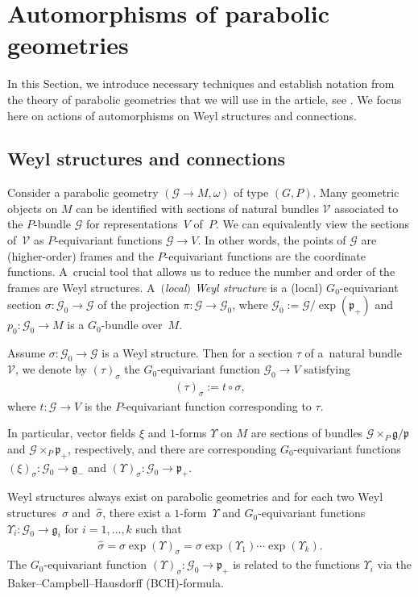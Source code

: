 \documentclass[10pt,a4paper]{amsart}
\newcommand{\om}{\omega}
\newcommand{\si}{\sigma}
\newcommand{\ba}{\mathcal{G}}
\newcommand{\fg}{\mathfrak g}
\newcommand{\fp}{\mathfrak p}
\newcommand{\U}{\Upsilon}
\numberwithin{equation}{section}
\begin{document}
\section{Automorphisms of parabolic geometries} \label{sec2}
In this Section, we introduce necessary techniques and establish notation from the theory of parabolic geometries that we will use in the article, see \cite[Section 5.1]{parabook}. We focus here on actions of automorphisms on Weyl structures and connections.

\subsection{Weyl structures and connections}\label{sec2.1}

Consider a parabolic geometry $(\ba \to M, \om)$ of type $(G,P)$. Many geometric objects on $M$ can be identif\/ied with sections of natural bundles $\mathcal{V}$ associated to the $P$-bundle $\ba$ for representa\-tions~$V$ of~$P$. We can equivalently view the sections of~$\mathcal{V}$ as $P$-equivariant functions $\ba \to V$. In other words, the points of $\ba$ are (higher-order) frames and the $P$-equivariant functions are the coordinate functions. A~crucial tool that allows us to reduce the number and order of the frames are Weyl structures. A~\emph{$($local$)$ Weyl structure} is a (local) $G_0$-equivariant section $\si\colon \ba_0 \to \ba$ of the projection $\pi\colon \ba \to \ba_0$, where $\ba_0:=\ba /\exp(\fp_+)$ and $p_0\colon \ba_0\to M$ is a $G_0$-bundle over~$M$.

\begin{Definition}
Assume $\si\colon \ba_0\to \ba$ is a Weyl structure. Then for a section $\tau$ of a~natural bundle $\mathcal{V}$, we denote by $(\tau)_\si$ the $G_0$-equivariant function $\ba_0 \to V$ satisfying \begin{gather*}(\tau)_\si:=t\circ\si,\end{gather*} where $t\colon \ba \to V$ is the $P$-equivariant function corresponding to $\tau$.
\end{Definition}

In particular, vector f\/ields $\xi$ and $1$-forms $\U$ on $M$ are sections of bundles $\ba\times_P \fg/\fp$ and $\ba\times_P \fp_+$, respectively, and there are corresponding $G_0$-equivariant functions $(\xi)_\si\colon \ba_0\to \fg_-$ and $(\U)_\si\colon \ba_0\to \fp_+$.

Weyl structures always exist on parabolic geometries and for each two Weyl structures~$\si$ and~$\hat \si$, there exist a $1$-form~$\U$ and $G_0$-equivariant functions $\U_i\colon \ba_0 \to \fg_i$ for $i=1,\dots, k$ such that
\begin{gather*}
\hat \si=\si\exp(\U)_\si=\si\exp(\U_1) \cdots \exp(\U_k).
\end{gather*}
The $G_0$-equivariant function $(\U)_\si\colon \ba_0 \to \fp_+$ is related to the functions $\U_i$ via the Baker--Campbell--Hausdorf\/f (BCH)-formula.
\end{document}
